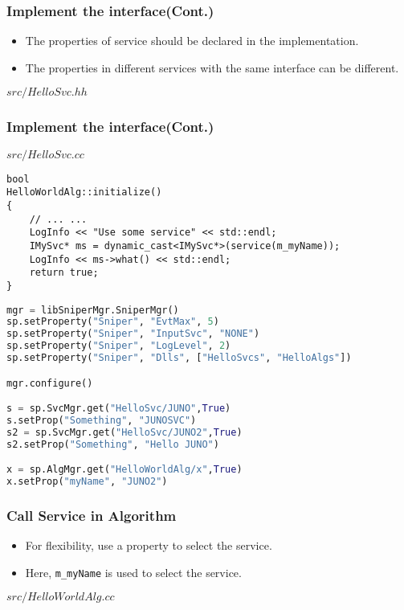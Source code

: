 \begin{frame}
    \frametitle{Implement the interface(Cont.)}
    \begin{itemize}
        \item The properties of service should be declared in the 
                implementation.
        \item The properties in different services with the same interface 
                can be different.
    \end{itemize}
    \begin{block}{\(src/HelloSvc.hh\)}
    \par\usebox{\implinterfaceheader}
    \end{block}
\end{frame}
\begin{frame}
    \frametitle{Implement the interface(Cont.)}
    \begin{block}{\(src/HelloSvc.cc\)}
    \par\usebox{\implinterfaceimpl}
    \end{block}
\end{frame}

\newsavebox{\callsvc}
\begin{lrbox}{\callsvc}
\begin{lstlisting}
bool
HelloWorldAlg::initialize()
{
    // ... ...
    LogInfo << "Use some service" << std::endl;
    IMySvc* ms = dynamic_cast<IMySvc*>(service(m_myName));
    LogInfo << ms->what() << std::endl;
    return true;
}
\end{lstlisting}
\end{lrbox}
\newsavebox{\callsvcpy}
\begin{lrbox}{\callsvcpy}
\begin{lstlisting}[language=python]
mgr = libSniperMgr.SniperMgr()
sp.setProperty("Sniper", "EvtMax", 5)
sp.setProperty("Sniper", "InputSvc", "NONE")
sp.setProperty("Sniper", "LogLevel", 2)
sp.setProperty("Sniper", "Dlls", ["HelloSvcs", "HelloAlgs"])

mgr.configure()

s = sp.SvcMgr.get("HelloSvc/JUNO",True)
s.setProp("Something", "JUNOSVC")
s2 = sp.SvcMgr.get("HelloSvc/JUNO2",True)
s2.setProp("Something", "Hello JUNO")

x = sp.AlgMgr.get("HelloWorldAlg/x",True)
x.setProp("myName", "JUNO2")
\end{lstlisting}
\end{lrbox}

\begin{frame}
    \frametitle{Call Service in Algorithm}
    \begin{itemize}
        \item For flexibility, use a property to select the service.
        \item Here, {\tt m\_myName} is used to select the service.
    \end{itemize}
    \begin{block}{\(src/HelloWorldAlg.cc\)}
        \par\usebox{\callsvc}
    \end{block}
\end{frame}

